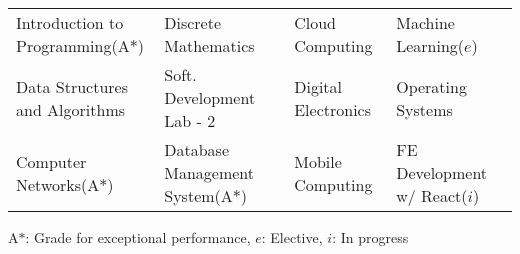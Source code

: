
\begin{tabular*}{\textwidth}{l l l l}
  Introduction to Programming(A$*$) & Discrete Mathematics  & Cloud Computing & Machine Learning($e$)
                                                                              \\
  Data Structures and Algorithms & Soft. Development Lab - 2 & Digital Electronics & Operating Systems \\
  Computer Networks(A$*$) &  Database Management System(A$*$) & Mobile Computing & FE Development w/ React($i$)
\end{tabular*}


{\footnotesize
    {A$*$: Grade for exceptional performance, $e$: Elective, $i$: In progress}
}

\vspace{-0.5cm}


